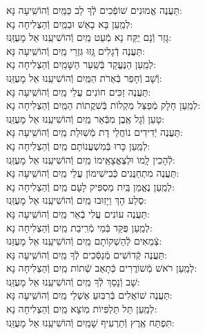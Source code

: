 \documentclass[twoside, openany, parskip=half, 11pt]{book}
\begin{document}
\begin{sometimes}
\begin{small}
תַּעֲנֶה אֱמוּנִים שׁוֹפְֿכִים לְֿךָ לֵב כַּמַּֽיִם \hfill וְֿהוֹשִֽׁיעָה נָּא:\\
לְמַֽעַן בָּא בָאֵשׁ וּבַמַּֽיִם \hfill וְֿהַצְלִיחָה נָא: \\
 גָּזַר וְֿנָם יֻקַּח נָא מְֿעַט מַֽיִם \hfill וְֿהוֹשִׁיעֵֽנוּ אֵל מָעֻזֵּֽנוּ:\\
תַּעֲנֶה דְֿגָלִים גָּֽזוּ גִּזְרֵי מַֽיִם \hfill וְֿהוֹשִֽׁיעָה נָּא:\\
לְמַֽעַן הַנֶּעֱקַד בְּֿשַֽׁעַר הַשָּׁמַֽיִם \hfill וְֿהַצְלִיחָה נָא:\\
 וְֿשָׁב וְֿחָפַר בְּֿאֵרֹת הַמַּֽיִם \hfill וְֿהוֹשִׁיעֵֽנוּ אֵל מָעֻזֵּֽנוּ:\\
תַּעֲנֶה זַכִּים חוֹנִים עֲלֵי מַֽיִם \hfill וְֿהוֹשִֽׁיעָה נָּא:\\
לְמַֽעַן חָלָק מְֿפַצֵּל מַקְלוֹת בְּֿשִׁקֲתוֹת הַמַּֽיִם \hfill וְֿהַצְלִיחָה נָא:\\
 טָעַן וְֿגָל אֶֽבֶן מִבְּֿאֵר מַֽיִם \hfill וְֿהוֹשִׁיעֵֽנוּ אֵל מָעֻזֵּֽנוּ:\\
תַּעֲנֶה יְֿדִידִים נוֹחֲלֵי דָת מְֿשֽׁוּלַת מַֽיִם \hfill וְֿהוֹשִֽׁיעָה נָּא: \\
לְמַֽעַן כָּרוּ בְּֿמִשְׁעֲנוֹתָם מַֽיִם \hfill וְֿהַצְלִיחָה נָא:\\
 לְֿהָכִין לָֽמוֹ וּלְצֶאֱצָאֵֽימוֹ מַֽיִם \hfill וְֿהוֹשִׁיעֵֽנוּ אֵל מָעֻזֵּֽנוּ:\\
תַּעֲנֶה מִתְחַנֲּנִים כְּֿבִישִׁימוֹן עֲלֵי מַֽיִם \hfill וְֿהוֹשִֽׁיעָה נָּא:\\
לְמַֽעַן נֶאֱמַן בַּֽיִת מַסְפִּיק לָעָם מַֽיִם \hfill וְֿהַצְלִיחָה נָא:\\
 סֶלַע הָךְ וַיָזֽוּבוּ מַֽיִם \hfill וְֿהוֹשִׁיעֵֽנוּ אֵל מָעֻזֵּֽנוּ: \\
תַּעֲנֶה עוֹנִים עֲלִי בְֿאֵר מַֽיִם \hfill וְֿהוֹשִֽׁיעָה נָּא: \\
לְמַֽעַן פֻּקַּד בְּֿמֵי מְֿרִֽיבַת מַֽיִם \hfill וְֿהַצְלִיחָה נָא:\\
 צְֿמֵאִים לְֿהַשְׁקוֹתָם מַֽיִם \hfill וְֿהוֹשִׁיעֵֽנוּ אֵל מָעֻזֵּנוּ: \\
תַּעֲנֶה קְֿדוֹשִׁים מְֿנַסְּֿכִים לְֿךָ מַֽיִם \hfill וְֿהוֹשִֽׁיעָה נָּא: \\
לְמַֽעַן רֹאשׁ מְֿשׁוֹרֲרִים כְּֿתָאַב שְֿׁתוֹת מַֽיִם \hfill וְֿהַצְלִיחָה נָא:\\
 שָׁב וְֿנָסַךְ לְֿךָ מַֽיִם \hfill וְֿהוֹשִׁיעֵֽנוּ אֵל מָעֻזֵּֽנוּ:\\
תַּעֲנֶה שׁוֹאֲלִים בְּֿרִבּֽוּעַ אֶשְׁלֵי מַֽיִם \hfill וְֿהוֹשִֽׁיעָה נָּא: \\
לְמַֽעַן תֵּל תַּלְפִּיוֹת מֽוֹצָא מַֽיִם \hfill וְֿהַצְלִיחָה נָא:\\
 תִּפְתַּח אֶֽרֶץ וְֿתַרְעִיף שָׁמַֽיִם \hfill וְֿהוֹשִׁיעֵֽנוּ אֵל מָעֻזֵּֽנוּ:


\end{small}
\end{sometimes}
\end{document}
